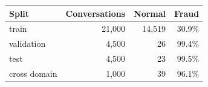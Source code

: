 \begin{tabular}{lrrr}
\toprule
Split & Conversations & Normal & Fraud \\
\midrule
train & 21{,}000 & 14{,}519 & 30.9\% \\
validation & 4{,}500 & 26 & 99.4\% \\
test & 4{,}500 & 23 & 99.5\% \\
cross domain & 1{,}000 & 39 & 96.1\% \\
\bottomrule
\end{tabular}
